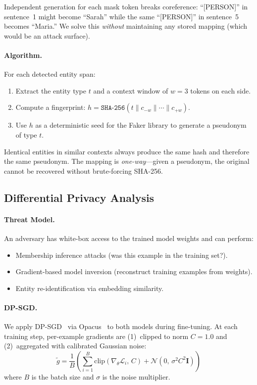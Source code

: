 \documentclass[11pt, a4paper]{article}
\begin{document}
Independent generation for each mask token breaks coreference:
``[PERSON]'' in sentence~1 might become ``Sarah'' while the same
``[PERSON]'' in sentence~5 becomes ``Maria.''  We solve this
\emph{without} maintaining any stored mapping (which would be an
attack surface).

\paragraph{Algorithm.}
For each detected entity span:
\begin{enumerate}[leftmargin=*]
  \item Extract the entity type $t$ and a context window of $w = 3$
        tokens on each side.
  \item Compute a fingerprint:
        $h = \texttt{SHA-256}(t \mathbin\| c_{-w} \mathbin\| \cdots
        \mathbin\| c_{+w})$.
  \item Use $h$ as a deterministic seed for the Faker library to
        generate a pseudonym of type $t$.
\end{enumerate}

Identical entities in similar contexts always produce the same hash
and therefore the same pseudonym.  The mapping is
\emph{one-way}---given a pseudonym, the original cannot be recovered
without brute-forcing SHA-256.

\subsection{Differential Privacy Analysis}
\label{sec:dp}

\paragraph{Threat Model.}
An adversary has white-box access to the trained model weights and can
perform:
\begin{itemize}[leftmargin=*]
  \item Membership inference attacks (was this example in the training
        set?).
  \item Gradient-based model inversion (reconstruct training examples
        from weights).
  \item Entity re-identification via embedding similarity.
\end{itemize}

\paragraph{DP-SGD.}
We apply DP-SGD~\cite{abadi2016deep} via
Opacus~\cite{opacus2021} to both models during fine-tuning.  At each
training step, per-example gradients are (1)~clipped to norm $C = 1.0$
and (2)~aggregated with calibrated Gaussian noise:
\begin{equation}
  \tilde{g} = \frac{1}{B}\left(\sum_{i=1}^{B}
    \text{clip}(\nabla_\theta \mathcal{L}_i,\, C)
    + \mathcal{N}(0,\, \sigma^2 C^2 \mathbf{I})\right)
  \label{eq:dpsgd}
\end{equation}
where $B$ is the batch size and $\sigma$ is the noise multiplier.
\end{document}
